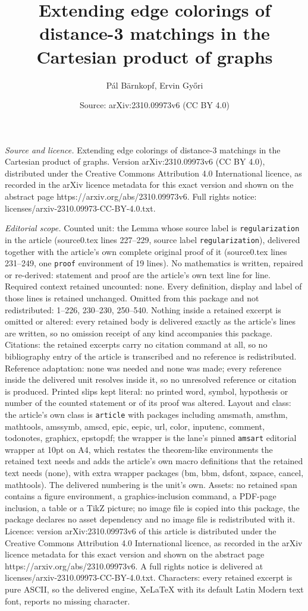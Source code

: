\documentclass[10pt,a4paper]{amsart}
\title[Extending edge colorings of distance-3 matchings in the Cart]{Extending edge colorings of distance-3 matchings in the Cartesian product of graphs}
\author{P\'al B\"arnkopf, Ervin Gy\H{o}ri}
\date{Source: arXiv:2310.09973v6 (CC BY 4.0)}
\begin{document}
\maketitle

\noindent\emph{Source and licence.} Extending edge colorings of distance-3 matchings in the Cartesian product of graphs. Version arXiv:2310.09973v6 (CC BY 4.0), distributed under the Creative Commons Attribution 4.0 International licence, as recorded in the arXiv licence metadata for this exact version and shown on the abstract page https://arxiv.org/abs/2310.09973v6. Full rights notice: licenses/arxiv-2310.09973-CC-BY-4.0.txt.\par\smallskip

\noindent\textit{Editorial scope.} Counted unit: the Lemma whose source label is \texttt{regularization} in the article (source0.tex lines 227--229, source label \texttt{regularization}), delivered together with the article's own complete original proof of it (source0.tex lines 231--249, one \texttt{proof} environment of 19 lines). No mathematics is written, repaired or re-derived: statement and proof are the article's own text line for line. Required context retained uncounted: none. Every definition, display and label of those lines is retained unchanged. Omitted from this package and not redistributed: 1--226, 230--230, 250--540. Nothing inside a retained excerpt is omitted or altered: every retained body is delivered exactly as the article's lines are written, so no omission receipt of any kind accompanies this package. Citations: the retained excerpts carry no citation command at all, so no bibliography entry of the article is transcribed and no reference is redistributed. Reference adaptation: none was needed and none was made; every reference inside the delivered unit resolves inside it, so no unresolved reference or citation is produced. Printed slips kept literal: no printed word, symbol, hypothesis or number of the counted statement or of its proof was altered. Layout and class: the article's own class is \texttt{article} with packages including amsmath, amsthm, mathtools, amssymb, amscd, epic, eepic, url, color, inputenc, comment, todonotes, graphicx, epstopdf; the wrapper is the lane's pinned \texttt{amsart} editorial wrapper at 10pt on A4, which restates the theorem-like environments the retained text needs and adds the article's own macro definitions that the retained text needs (none), with extra wrapper packages (bm, bbm, dsfont, xspace, cancel, mathtools). The delivered numbering is the unit's own. Assets: no retained span contains a figure environment, a graphics-inclusion command, a PDF-page inclusion, a table or a TikZ picture; no image file is copied into this package, the package declares no asset dependency and no image file is redistributed with it. Licence: version arXiv:2310.09973v6 of this article is distributed under the Creative Commons Attribution 4.0 International licence, as recorded in the arXiv licence metadata for this exact version and shown on the abstract page https://arxiv.org/abs/2310.09973v6. A full rights notice is delivered at licenses/arxiv-2310.09973-CC-BY-4.0.txt. Characters: every retained excerpt is pure ASCII, so the delivered engine, XeLaTeX with its default Latin Modern text font, reports no missing character.
\end{document}

